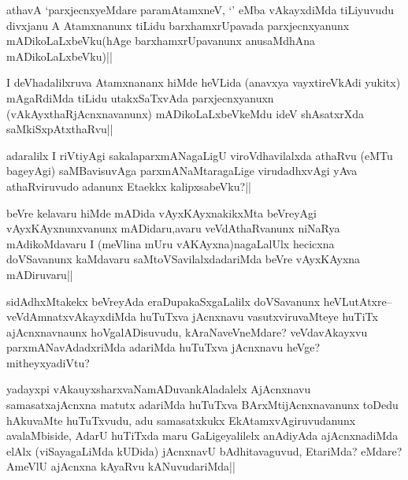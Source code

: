 
\begin{artha}
athavA `parxjecnxyeMdare paramAtamxneV, `\stext' eMba vAkayxdiMda tiLiyuvudu divxjanu A Atamxnanunx tiLidu barxhamxrUpavada parxjecnxyanunx mADikoLaLxbeVku(hAge barxhamxrUpavanunx anusaMdhAna mADikoLaLxbeVku)||
\end{artha}


\begin{artha}
I deVhadalilxruva Atamxnananx hiMde heVLida (anavxya vayxtireVkAdi yukitx) mAgaRdiMda tiLidu utakxSaTxvAda parxjecnxyanuxn (vAkAyxthaRjAcnxnavanunx) mADikoLaLxbeVkeMdu ideV shAsatxrXda saMkiSxpAtxthaRvu||
\end{artha}

\begin{artha}
adaralilx I riVtiyAgi sakalaparxmANagaLigU viroVdhavilalxda athaRvu (eMTu bageyAgi) saMBavisuvAga parxmANaMtaragaLige virudadhxvAgi yAva athaRviruvudo adanunx Etaekkx kalipxsabeVku?||
\end{artha}


\begin{artha}
beVre kelavaru hiMde mADida vAyxKAyxnakikxMta beVreyAgi vAyxKAyxnunxvanunx mADidaru,avaru veVdAthaRvanunx niNaRya mAdikoMdavaru I (meVlina mUru vAKAyxna)nagaLalUlx hecicxna doVSavanunx kaMdavaru saMtoVSavilalxdadariMda beVre vAyxKAyxna mADiruvaru||
\end{artha}

\begin{artha}
sidAdhxMtakekx beVreyAda eraDupakaSxgaLalilx doVSavanunx heVLutAtxre-- veVdAmnatxvAkayxdiMda huTuTxva jAcnxnavu vasutxviruvaMteye huTiTx ajAcnxnavnaunx hoVgalADisuvudu, kAraNaveVneMdare? veVdavAkayxvu parxmANavAdadxriMda adariMda huTuTxva jAcnxnavu heVge? mitheyxyadiVtu?
\end{artha}


\begin{artha}
yadayxpi vAkauyxsharxvaNamADuvankAladalelx AjAcnxnavu samasatxajAcnxna matutx adariMda huTuTxva BArxMtijAcnxnavanunx toDedu hAkuvaMte huTuTxvudu, adu samasatxkukx EkAtamxvAgiruvudanunx avalaMbiside, AdarU huTiTxda maru GaLigeyalilelx anAdiyAda ajAcnxnadiMda elAlx (viSayagaLiMda kUDida) jAcnxnavU bAdhitavaguvud, EtariMda? eMdare? AmeVlU ajAcnxna kAyaRvu kANuvudariMda||
\end{artha}

